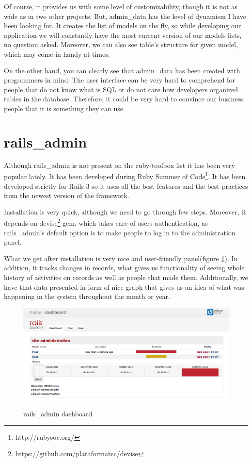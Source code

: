   Of course, it provides us with some level of customizability, though it is not as wide as in two other projects. But, admin\_data has the level of dynamism I have been looking for. It creates the list of models on the fly, so while developing our application we will constantly have the most current version of our models lists, no question asked. Moreover, we can also see table's structure for given model, which may come in handy at times.
  
  On the other hand, you can clearly see that admin\_data has been created with programmers in mind. The user interface can be very hard to comprehend for people that do not know what is SQL or do not care how developers organized tables in the database. Therefore, it could be very hard to convince our business people that it is something they can use.
  
  \section{rails\_admin}
  Although rails\_admin is not present on the ruby-toolbox list it has been very popular lately. It has been developed during Ruby Summer of Code\footnote{http://rubysoc.org/}. It has been developed strictly for Rails 3 so it uses all the best features and the best practices from the newest version of the framework.
  
  Installation is very quick, although we need to go through few steps. Moreover, it depends on devise\footnote{https://github.com/plataformatec/devise} gem, which takes care of users authentication, as rails\_admin's default option is to make people to log in to the administration panel.
  
  What we get after installation is very nice and user-friendly panel(figure \ref{railsadmin1}). In addition, it tracks changes in records, what gives us functionality of seeing whole history of activities on records as well as people that made them. Additionally, we have that data presented in form of nice graph that gives us an idea of what was happening in the system throughout the month or year.
  
  
  \begin{figure}[hbt!]
		\begin{center}
			\includegraphics[width=\linewidth]{images/chapter01/railsadmin1.png}
			\caption{rails\_admin dashboard}
			\label{railsadmin1}
		\end{center}
	\end{figure}
	
